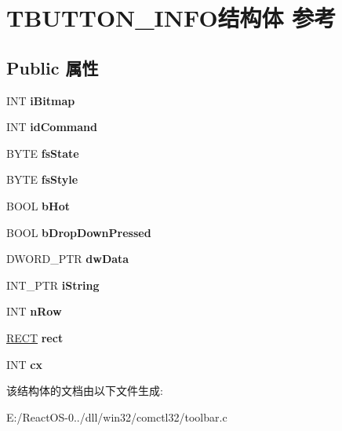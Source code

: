 \hypertarget{struct_t_b_u_t_t_o_n___i_n_f_o}{}\section{T\+B\+U\+T\+T\+O\+N\+\_\+\+I\+N\+F\+O结构体 参考}
\label{struct_t_b_u_t_t_o_n___i_n_f_o}
\subsection*{Public 属性}
\begin{DoxyCompactItemize}
\item 
\mbox{\label{struct_t_b_u_t_t_o_n___i_n_f_o_ab7d45c5c486d605b003eb6e067133658}} 
I\+NT {\bfseries i\+Bitmap}
\item 
\mbox{\label{struct_t_b_u_t_t_o_n___i_n_f_o_ad6532cbee6e8043cc9c07b378687e984}} 
I\+NT {\bfseries id\+Command}
\item 
\mbox{\label{struct_t_b_u_t_t_o_n___i_n_f_o_a6e259511d79c089b5365b4e68f99b525}} 
B\+Y\+TE {\bfseries fs\+State}
\item 
\mbox{\label{struct_t_b_u_t_t_o_n___i_n_f_o_a097ee17ceef6e587841d94cdcd66bc32}} 
B\+Y\+TE {\bfseries fs\+Style}
\item 
\mbox{\label{struct_t_b_u_t_t_o_n___i_n_f_o_aaf43d2448af6e57ee54d05b23ab4891d}} 
B\+O\+OL {\bfseries b\+Hot}
\item 
\mbox{\label{struct_t_b_u_t_t_o_n___i_n_f_o_a7141e6cab054d29ece4f993b75cb2222}} 
B\+O\+OL {\bfseries b\+Drop\+Down\+Pressed}
\item 
\mbox{\label{struct_t_b_u_t_t_o_n___i_n_f_o_aeba7e94ece4c64040be8dbfa4569bca5}} 
D\+W\+O\+R\+D\+\_\+\+P\+TR {\bfseries dw\+Data}
\item 
\mbox{\label{struct_t_b_u_t_t_o_n___i_n_f_o_a12f0fa9e827c0613a4e6eb02c3f6775f}} 
I\+N\+T\+\_\+\+P\+TR {\bfseries i\+String}
\item 
\mbox{\label{struct_t_b_u_t_t_o_n___i_n_f_o_a67647845657e74ad3e99d7d9929e19a9}} 
I\+NT {\bfseries n\+Row}
\item 
\mbox{\label{struct_t_b_u_t_t_o_n___i_n_f_o_a43e9632c2c749f920a076896402de452}} 
\hyperlink{structtag_r_e_c_t}{R\+E\+CT} {\bfseries rect}
\item 
\mbox{\label{struct_t_b_u_t_t_o_n___i_n_f_o_a166fcd00cc203bfd9919498cff0bf44d}} 
I\+NT {\bfseries cx}
\end{DoxyCompactItemize}


该结构体的文档由以下文件生成\+:\begin{DoxyCompactItemize}
\item 
E\+:/\+React\+O\+S-\/0../dll/win32/comctl32/toolbar.\+c\end{DoxyCompactItemize}
